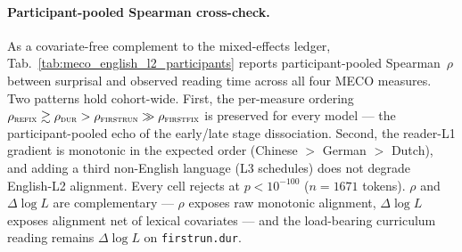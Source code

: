 \newpage 
\paragraph{Participant-pooled Spearman cross-check.} As a covariate-free complement to the mixed-effects ledger, Tab.~\ref{tab:meco_english_l2_participants} reports participant-pooled Spearman~$\rho$ between \beetle{} surprisal and observed reading time across all four MECO measures. Two patterns hold cohort-wide. First, the per-measure ordering $\rho_\textsc{refix} \gtrsim \rho_\textsc{dur} > \rho_\textsc{firstrun} \gg \rho_\textsc{firstfix}$ is preserved for every model --- the participant-pooled echo of the early/late stage dissociation. Second, the reader-L1 gradient is monotonic in the expected order (Chinese $>$ German $>$ Dutch), and adding a third non-English language (L3 schedules) does not degrade English-L2 alignment. Every cell rejects at $p<10^{-100}$ ($n=1671$ tokens). $\rho$ and $\Delta\log L$ are complementary --- $\rho$ exposes raw monotonic alignment, $\Delta\log L$ exposes alignment net of lexical covariates --- and the load-bearing curriculum reading remains $\Delta\log L$ on \texttt{firstrun.dur}.

